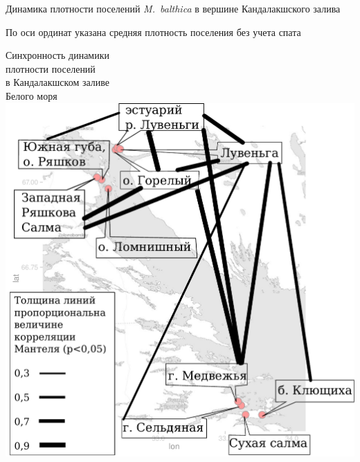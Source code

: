 \documentclass{beamer}
\begin{document}
\begin{frame}{Динамика плотности поселений {\it M.~balthica} в вершине Кандалакшского залива}
\begin{minipage}[b]{.45\linewidth}
\begin{center}
		\end{center}
{\tiny По оси ординат указана средняя плотность поселения без учета спата}
	\end{minipage}
\hfill
	\begin{minipage}[b]{.5\linewidth}
		\begin{center}
{\scriptsize Синхронность динамики\\ плотности поселений \\в Кандалакшском заливе\\ Белого моря\\}
			\includegraphics[height=.55\textheight]{mantel_map.pdf}
		\end{center}
	\end{minipage}
\end{frame}
\end{document}

